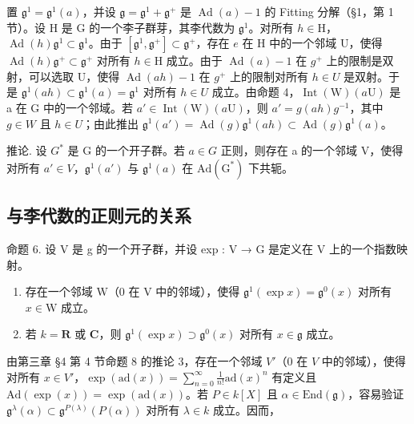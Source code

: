 置 \(\mathfrak{g}^1 = \mathfrak{g}^1(a)\)，并设 \(\mathfrak{g} = \mathfrak{g}^1 + \mathfrak{g}^+\) 是 \(\operatorname{Ad}(a) - 1\) 的 Fitting 分解（§1，第 1 节）。设 H 是 G 的一个李子群芽，其李代数为 \(\mathfrak{g}^1\)。对所有 \(h \in \mathrm{H}\)，\(\operatorname{Ad}(h)\mathfrak{g}^1 \subset \mathfrak{g}^1\)。由于 \([\mathfrak{g}^1, \mathfrak{g}^+] \subset \mathfrak{g}^+\)，存在 \(e\) 在 H 中的一个邻域 U，使得 \(\operatorname{Ad}(h)\mathfrak{g}^+ \subset \mathfrak{g}^+\) 对所有 \(h \in \mathrm{H}\) 成立。由于 \(\operatorname{Ad}(a)-1\) 在 \(g^{+}\) 上的限制是双射，可以选取 U，使得 \(\operatorname{Ad}(ah)-1\) 在 \(g^{+}\) 上的限制对所有 \(h\in U\) 是双射。于是 \(\mathfrak{g}^{1}(ah)\subset\mathfrak{g}^{1}(a)=\mathfrak{g}^{1}\) 对所有 \(h\in U\) 成立。由命题 4，\(\operatorname{Int}(\mathrm{W})(a\mathrm{U})\) 是 a 在 G 中的一个邻域。若 \(a'\in\operatorname{Int}(\mathrm{W})(a\mathrm{U})\)，则 \(a'=g(ah)g^{-1}\)，其中 \(g\in W\) 且 \(h\in U\)；由此推出 \(\mathfrak{g}^{1}(a')=\operatorname{Ad}(g)\mathfrak{g}^{1}(ah)\subset\operatorname{Ad}(g)\mathfrak{g}^{1}(a)\)。

推论. 设 \(G^{*}\) 是 G 的一个开子群。若 \(a \in G\) 正则，则存在 a 的一个邻域 V，使得对所有 \(a' \in V\)，\(\mathfrak{g}^{1}(a')\) 与 \(\mathfrak{g}^{1}(a)\) 在 \(\mathrm{Ad}(\mathrm{G}^{*})\) 下共轭。

\subsection{与李代数的正则元的关系}

命题 6. 设 V 是 g 的一个开子群，并设 exp : V → G 是定义在 V 上的一个指数映射。

\begin{enumerate}
\def\labelenumi{(\roman{enumi})}
\item
  存在一个邻域 \(\mathrm{W}\)（0 在 \(\mathrm{V}\) 中的邻域），使得 \(\mathfrak{g}^1(\exp x) = \mathfrak{g}^0(x)\) 对所有 \(x \in \mathrm{W}\) 成立。
\item
  若 \(k = \mathbf{R}\) 或 \(\mathbf{C}\)，则 \(\mathfrak{g}^1(\exp x) \supset \mathfrak{g}^0(x)\) 对所有 \(x \in \mathfrak{g}\) 成立。
\end{enumerate}

由第三章 §4 第 4 节命题 8 的推论 3，存在一个邻域 \(V'\)（0 在 \(V\) 中的邻域），使得对所有 \(x \in V'\)，\(\exp(\mathrm{ad}(x)) = \sum_{n=0}^{\infty} \frac{1}{n!} \mathrm{ad}(x)^n\) 有定义且 \(\mathrm{Ad}(\exp(x)) = \exp(\mathrm{ad}(x))\)。若 \(P \in k[X]\) 且 \(\alpha \in \mathrm{End}(\mathfrak{g})\)，容易验证 \(\mathfrak{g}^\lambda(\alpha) \subset \mathfrak{g}^{P(\lambda)}(P(\alpha))\) 对所有 \(\lambda \in k\) 成立。因而，

